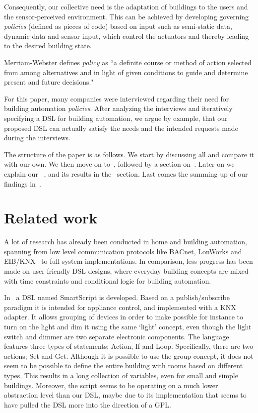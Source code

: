 \documentclass{llncs}
\begin{document}
Consequently, our collective need is the adaptation of buildings to the users and the sensor-perceived environment. This can be achieved by developing governing \textit{policies} (defined as pieces of code) based on input such as semi-static data, dynamic data and sensor input, which control the actuators and thereby leading to the desired building state.

Merriam-Webster defines \textit{policy} as ``a definite course or method of action selected from among alternatives and in light of given conditions to guide and determine present and future decisions."

For this paper, many companies were interviewed regarding their need for building automation \textit{policies}. After analyzing the interviews and iteratively specifying a DSL for building automation, we argue by example, that our proposed DSL can actually satisfy the needs and the intended requests made during the interviews.

The structure of the paper is as follows. We start by discussing all  and compare it with our own. We then move on to~, followed by a section on~. Later on we explain our~ , and its results in the~ section. Last comes the summing up of our findings in~.

\section{Related work}\label{sec:relatedwork}
A lot of research has already been conducted in home and building automation, spanning from low level communication protocols like BACnet, LonWorks and EIB/KNX~\cite{communication} to full system implementations. In comparison, less progress has been made on user friendly DSL designs, where everyday building concepts are mixed with time constraints and conditional logic for building automation. 

In~\cite{smartscript} a DSL named SmartScript is developed. Based on a publish/subscribe paradigm it is intended for appliance control, and implemented with a KNX adapter. It allows grouping of devices in order to make possible for instance to turn on the light and dim it using the same `light' concept, even though the light switch and dimmer are two separate electronic components. The language features three types of statements; Action, If and Loop. Specifically, there are two actions; Set and Get. Although it is possible to use the group concept, it does not seem to be possible to define the entire building with rooms based on different types. This results in a long collection of variables, even for small and simple buildings. Moreover, the script seems to be operating on a much lower abstraction level than our DSL, maybe due to its implementation that seems to have pulled the DSL more into the direction of a GPL. 
\end{document}
